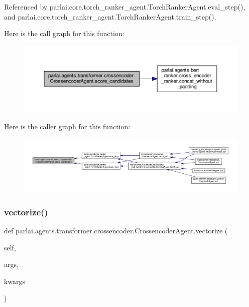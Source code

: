 Referenced by parlai.\+core.\+torch\+\_\+ranker\+\_\+agent.\+Torch\+Ranker\+Agent.\+eval\+\_\+step(), and parlai.\+core.\+torch\+\_\+ranker\+\_\+agent.\+Torch\+Ranker\+Agent.\+train\+\_\+step().

Here is the call graph for this function\+:
\nopagebreak
\begin{figure}[H]
\begin{center}
\leavevmode
\includegraphics[width=350pt]{classparlai_1_1agents_1_1transformer_1_1crossencoder_1_1CrossencoderAgent_a5c286ce0bc163e443e73182f95d6e0c6_cgraph}
\end{center}
\end{figure}
Here is the caller graph for this function\+:
\nopagebreak
\begin{figure}[H]
\begin{center}
\leavevmode
\includegraphics[width=350pt]{classparlai_1_1agents_1_1transformer_1_1crossencoder_1_1CrossencoderAgent_a5c286ce0bc163e443e73182f95d6e0c6_icgraph}
\end{center}
\end{figure}
\mbox{\label{classparlai_1_1agents_1_1transformer_1_1crossencoder_1_1CrossencoderAgent_a736057f000f0d4cdb5d006e10c4291db}} 
\subsubsection{\texorpdfstring{vectorize()}{vectorize()}}
{\footnotesize\ttfamily def parlai.\+agents.\+transformer.\+crossencoder.\+Crossencoder\+Agent.\+vectorize (\begin{DoxyParamCaption}\item[{}]{self,  }\item[{}]{args,  }\item[{}]{kwargs }\end{DoxyParamCaption})}

